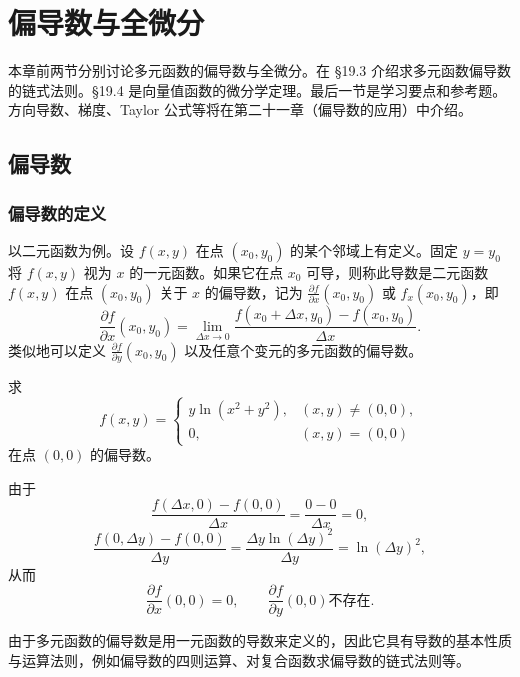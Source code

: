 \chapter{偏导数与全微分}


本章前两节分别讨论多元函数的偏导数与全微分。在 §19.3 介绍求多元函数偏导数的链式法则。§19.4 是向量值函数的微分学定理。最后一节是学习要点和参考题。方向导数、梯度、Taylor 公式等将在第二十一章（偏导数的应用）中介绍。

\section{偏导数}

\subsection{偏导数的定义}

以二元函数为例。设 $f(x,y)$ 在点 $(x_0,y_0)$ 的某个邻域上有定义。固定 $y=y_0$ 将 $f(x,y)$ 视为 $x$ 的一元函数。如果它在点 $x_0$ 可导，则称此导数是二元函数 $f(x,y)$ 在点 $(x_0,y_0)$ 关于 $x$ 的偏导数，记为 $\frac{\partial f}{\partial x}(x_0,y_0)$ 或 $f_x(x_0,y_0)$，即
\[
  \frac{\partial f}{\partial x}(x_0,y_0)
  =\lim_{\Delta x\to0}\frac{f(x_0+\Delta x,y_0)-f(x_0,y_0)}{\Delta x}.
\]
类似地可以定义 $\frac{\partial f}{\partial y}(x_0,y_0)$ 以及任意个变元的多元函数的偏导数。

\begin{xexample}[19.1.1]
求
\[
  f(x,y)=
  \begin{cases}
    y\ln(x^2+y^2), & (x,y)\ne(0,0),\\
    0, & (x,y)=(0,0)
  \end{cases}
\]
在点 $(0,0)$ 的偏导数。
\end{xexample}
\begin{xsolution}
由于
\[
  \frac{f(\Delta x,0)-f(0,0)}{\Delta x}=\frac{0-0}{\Delta x}=0,
\]
\[
  \frac{f(0,\Delta y)-f(0,0)}{\Delta y}
  =\frac{\Delta y\ln(\Delta y)^2}{\Delta y}=\ln(\Delta y)^2,
\]
从而
\[
  \frac{\partial f}{\partial x}(0,0)=0,
  \qquad
  \frac{\partial f}{\partial y}(0,0)\text{不存在}.
\]
\end{xsolution}

由于多元函数的偏导数是用一元函数的导数来定义的，因此它具有导数的基本性质与运算法则，例如偏导数的四则运算、对复合函数求偏导数的链式法则等。

